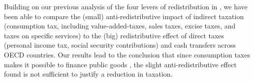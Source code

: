 \documentclass[12pt]{article}
\begin{document}
Building on our previous analysis of the four levers of redistribution in \cite{guillaud2019fourlevers}, we have been able to compare the (small) anti-redistributive impact of indirect taxation (consumption tax, including value-added-taxes, sales taxes, excise taxes, and taxes on specific services) to the (big) redistributive effect of direct taxes (personal income tax, social security contributions) and cash transfers across OECD countries. Our results lead to the conclusion that since consumption taxes makes it possible to finance public goods \citep{kato2003}, the slight anti-redistributive effect found is not sufficient to justify a reduction in taxation.



\newpage

\appendix

\end{document}
